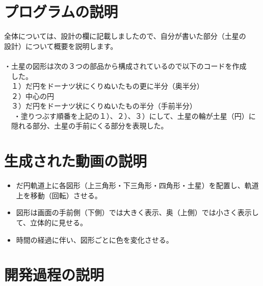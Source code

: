 \documentclass[12pt,a4j]{jarticle}
\begin{document}
\section{プログラムの説明}

全体については、設計の欄に記載しましたので、自分が書いた部分（土星の\\
設計）について概要を説明します。\\
\\
・土星の図形は次の３つの部品から構成されているので以下のコードを作成\\
　した。\\
　１）だ円をドーナツ状にくりぬいたもの更に半分（奥半分）\\
　２）中心の円　\\
　３）だ円をドーナツ状にくりぬいたもの半分（手前半分）\\　
・塗りつぶす順番を上記の１）、２）、３）にして、土星の輪が土星（円）に\\
　隠れる部分、土星の手前にくる部分を表現した。\\

\section{生成された動画の説明}
\begin{itemize}
  \item だ円軌道上に各図形（上三角形・下三角形・四角形・土星）を配置し、軌道上を移動（回転）させる。
  \item 図形は画面の手前側（下側）では大きく表示、奥（上側）では小さく表示して、立体的に見せる。
  \item 時間の経過に伴い、図形ごとに色を変化させる。
\end{itemize}

\section{開発過程の説明}
\end{document}
